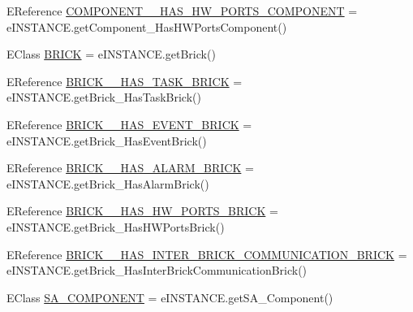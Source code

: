 \begin{DoxyCompactItemize}
\item 
E\-Reference \hyperlink{interfaceshootingmachineemfmodel_1_1_shootingmachineemfmodel_package_1_1_literals_af00875b2bf09abb0623ee37ecc1eadcb}{C\-O\-M\-P\-O\-N\-E\-N\-T\-\_\-\-\_\-\-H\-A\-S\-\_\-\-H\-W\-\_\-\-P\-O\-R\-T\-S\-\_\-\-C\-O\-M\-P\-O\-N\-E\-N\-T} = e\-I\-N\-S\-T\-A\-N\-C\-E.\-get\-Component\-\_\-\-Has\-H\-W\-Ports\-Component()
\item 
E\-Class \hyperlink{interfaceshootingmachineemfmodel_1_1_shootingmachineemfmodel_package_1_1_literals_aeda309dbd4de2ccf2cad42f23991a952}{B\-R\-I\-C\-K} = e\-I\-N\-S\-T\-A\-N\-C\-E.\-get\-Brick()
\item 
E\-Reference \hyperlink{interfaceshootingmachineemfmodel_1_1_shootingmachineemfmodel_package_1_1_literals_ace663d9af7558e3ffaf107fc2bfd2a1d}{B\-R\-I\-C\-K\-\_\-\-\_\-\-H\-A\-S\-\_\-\-T\-A\-S\-K\-\_\-\-B\-R\-I\-C\-K} = e\-I\-N\-S\-T\-A\-N\-C\-E.\-get\-Brick\-\_\-\-Has\-Task\-Brick()
\item 
E\-Reference \hyperlink{interfaceshootingmachineemfmodel_1_1_shootingmachineemfmodel_package_1_1_literals_a34373f53d36caa5f691d30fbca28baf6}{B\-R\-I\-C\-K\-\_\-\-\_\-\-H\-A\-S\-\_\-\-E\-V\-E\-N\-T\-\_\-\-B\-R\-I\-C\-K} = e\-I\-N\-S\-T\-A\-N\-C\-E.\-get\-Brick\-\_\-\-Has\-Event\-Brick()
\item 
E\-Reference \hyperlink{interfaceshootingmachineemfmodel_1_1_shootingmachineemfmodel_package_1_1_literals_afbd4cc7a09e1ba73ef82ce8898cb2eb7}{B\-R\-I\-C\-K\-\_\-\-\_\-\-H\-A\-S\-\_\-\-A\-L\-A\-R\-M\-\_\-\-B\-R\-I\-C\-K} = e\-I\-N\-S\-T\-A\-N\-C\-E.\-get\-Brick\-\_\-\-Has\-Alarm\-Brick()
\item 
E\-Reference \hyperlink{interfaceshootingmachineemfmodel_1_1_shootingmachineemfmodel_package_1_1_literals_a30e0a585f71efea6eee6c72f3f9b02c7}{B\-R\-I\-C\-K\-\_\-\-\_\-\-H\-A\-S\-\_\-\-H\-W\-\_\-\-P\-O\-R\-T\-S\-\_\-\-B\-R\-I\-C\-K} = e\-I\-N\-S\-T\-A\-N\-C\-E.\-get\-Brick\-\_\-\-Has\-H\-W\-Ports\-Brick()
\item 
E\-Reference \hyperlink{interfaceshootingmachineemfmodel_1_1_shootingmachineemfmodel_package_1_1_literals_a107b9d73a66fe4f8841c233d631d7053}{B\-R\-I\-C\-K\-\_\-\-\_\-\-H\-A\-S\-\_\-\-I\-N\-T\-E\-R\-\_\-\-B\-R\-I\-C\-K\-\_\-\-C\-O\-M\-M\-U\-N\-I\-C\-A\-T\-I\-O\-N\-\_\-\-B\-R\-I\-C\-K} = e\-I\-N\-S\-T\-A\-N\-C\-E.\-get\-Brick\-\_\-\-Has\-Inter\-Brick\-Communication\-Brick()
\item 
E\-Class \hyperlink{interfaceshootingmachineemfmodel_1_1_shootingmachineemfmodel_package_1_1_literals_a02c09c502db1f3c903cbd6282befc333}{S\-A\-\_\-\-C\-O\-M\-P\-O\-N\-E\-N\-T} = e\-I\-N\-S\-T\-A\-N\-C\-E.\-get\-S\-A\-\_\-\-Component()

\end{DoxyCompactItemize}
